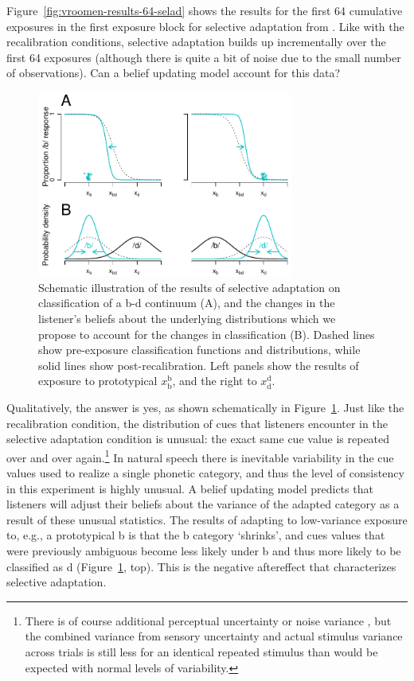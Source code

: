 Figure~\ref{fig:vroomen-results-64-selad} shows the results for the first 64 cumulative exposures in the first exposure block for selective adaptation from \textcite{Vroomen2007}.  Like with the recalibration conditions, selective adaptation builds up incrementally over the first 64 exposures (although there is quite a bit of noise due to the small number of observations).  Can a belief updating model account for this data?

\begin{figure}[htb]
  \centering
  \includegraphics[width=0.75\textwidth]{figs/belief-updating-selad-schematic.pdf}
  \caption{Schematic illustration of the results of selective adaptation on classification of a \ph b-\ph d continuum (A), and the changes in the listener's beliefs about the underlying distributions which we propose to account for the changes in classification (B).  Dashed lines show pre-exposure classification functions and distributions, while solid lines show post-recalibration.  Left panels show the results of exposure to prototypical $x_\mathrm{b}^\mathrm{b}$, and the right to $x_\mathrm{d}^\mathrm{d}$.}
  \label{fig:belief-updating-selad-schematic}
\end{figure}


Qualitatively, the answer is yes, as shown schematically in Figure~\ref{fig:belief-updating-selad-schematic}.  Just like the recalibration condition, the distribution of cues that listeners encounter in the selective adaptation condition is unusual: the exact same cue value is repeated over and over again.\footnote{There is of course additional perceptual uncertainty or noise variance \autocite{Feldman2009a}, but the combined variance from sensory uncertainty and actual stimulus variance across trials is still less for an identical repeated stimulus than would be expected with normal levels of variability.}  In natural speech there is inevitable variability in the cue values used to realize a single phonetic category, and thus the level of consistency in this experiment is highly unusual.  A belief updating model predicts that listeners will adjust their beliefs about the variance of the adapted category as a result of these unusual statistics.  The results of adapting to low-variance exposure to, e.g., a prototypical \ph b is that the \ph b category `shrinks', and cues values that were previously ambiguous become less likely under \ph b and thus more likely to be classified as \ph d (Figure~\ref{fig:belief-updating-selad-schematic}, top).  This is the negative aftereffect that characterizes selective adaptation.

